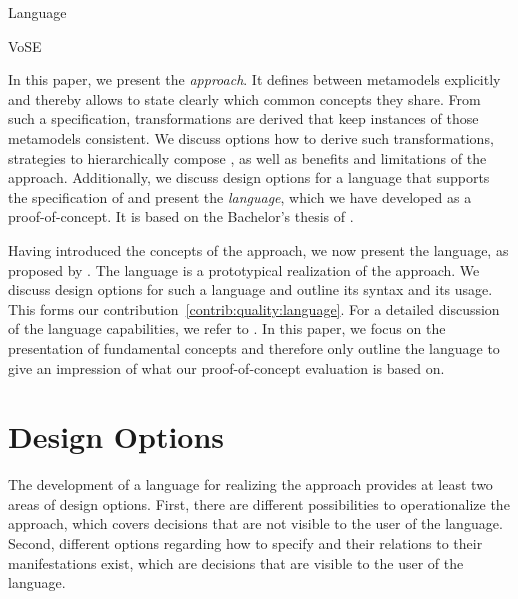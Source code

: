 \begin{insight}{Language}

\end{insight}


\begin{copiedFrom}{VoSE}

In this paper, we present the \emph{\commonalities approach}. %
It defines \commonalities between metamodels explicitly and thereby allows to state clearly which common concepts they share.
From such a specification, transformations are derived that keep instances of those metamodels consistent.
We discuss options how to derive such transformations, strategies to hierarchically compose \commonalities, as well as benefits and limitations of the approach.
Additionally, we discuss design options for a language that supports the specification of \commonalities and present the \emph{\commonalities language}, which we have developed as a proof-of-concept.
It is based on the Bachelor's thesis of \textcite{gleitze2017a}.

Having introduced the concepts of the \commonalities approach, we now present the \commonalities language, as proposed by \textcite{gleitze2017a}.
The language is a prototypical realization of the approach.
We discuss design options for such a language and outline its syntax and its usage.
This forms our contribution~\autoref{contrib:quality:language}.
For a detailed discussion of the language capabilities, we refer to \cite{gleitze2017a}.
In this paper, we focus on the presentation of fundamental concepts  and therefore only outline the language to give an impression of what our proof-of-concept evaluation is based on.


\section*{Design Options}

The development of a language for realizing the \commonalities approach provides at least two areas of design options.
First, there are different possibilities to operationalize the approach, which covers decisions that are not visible to the user of the language.
Second, different options regarding how to specify \conceptmetamodels and their relations to their manifestations exist, which are decisions that are visible to the user of the language.


\end{copiedFrom}
